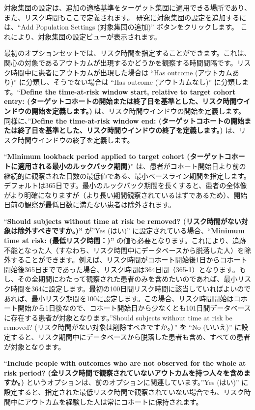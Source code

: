 \documentclass[
  11pt]{book}
\theoremstyle{definition}
\theoremstyle{definition}
\theoremstyle{definition}
\theoremstyle{definition}
\theoremstyle{remark}
\begin{document}
対象集団の設定は、追加の適格基準をターゲット集団に適用できる場所であり、また、リスク時間もここで定義されます。 研究に対象集団の設定を追加するには、``Add Population Settings (対象集団の追加)'' ボタンをクリックします。 これにより、対象集団の設定ビューが表示されます。

最初のオプションセットでは、リスク時間を指定することができます。これは、関心の対象であるアウトカムが出現するかどうかを観察する時間間隔です。リスク時間中に患者にアウトカムが出現した場合は ``Has outcome (アウトカムあり)'' に分類し、そうでない場合は ``Has outcome (アウトカムなし)'' に分類します。``\textbf{Define the time-at-risk window start, relative to target cohort entry: (ターゲットコホートの開始または終了日を基準とした、リスク時間ウインドウの開始を定義します。)} は、リスク時間ウインドウの開始を定義します。同様に、''\textbf{Define the time-at-risk window end: (ターゲットコホートの開始または終了日を基準とした、リスク時間ウインドウの終了を定義します。)} は、リスク時間ウインドウの終了を定義します。

``\textbf{Minimum lookback period applied to target cohort (ターゲットコホートに適用される最小のルックバック期間)}'' は、患者がコホート開始日より前の継続的に観察された日数の最低値である、最小ベースライン期間を指定します。デフォルトは365日です。最小のルックバック期間を長くすると、患者の全体像がより明確になりますが（より長い期間観察されているはずであるため）、開始日前の観察が最低日数に満たない患者は除外されます。

``\textbf{Should subjects without time at risk be removed? (リスク時間がない対象は除外すべきですか。)''} が''Yes (はい)'' に設定されている場合、``\textbf{Minimum time at risk: (最低リスク時間：)''} の値も必要となります。これにより、追跡不能となった人（すなわち、リスク時間中にデータベースから脱落した人）を除外することができます。例えば、リスク時間がコホート開始後1日からコホート開始後365日までであった場合、リスク時間は364日間（365-1）となります。もし、その全期間にわたって観察された患者のみを含めたいのであれば、最小リスク時間を364に設定します。最初の100日間リスク時間に該当していればよいのであれば、最小リスク期間を100に設定します。この場合、リスク時間開始はコホート開始から1日後なので、コホート開始日から少なくとも101日間データベースに存在する患者が対象となります。''Should subjects without time at risk be removed? (リスク時間がない対象は削除すべきですか。）'' を ``No (いいえ)'' に設定すると、リスク期間中にデータベースから脱落した患者も含め、すべての患者が対象となります。

``\textbf{Include people with outcomes who are not observed for the whole at risk period? (全リスク時間で観察されていないアウトカムを持つ人々を含めますか。)} というオプションは、前のオプションに関連しています。''Yes (はい)'' に設定すると、指定された最低リスク時間で観察されていない場合でも、リスク時間中にアウトカムを経験した人は常にコホートに保持されます。
\end{document}
